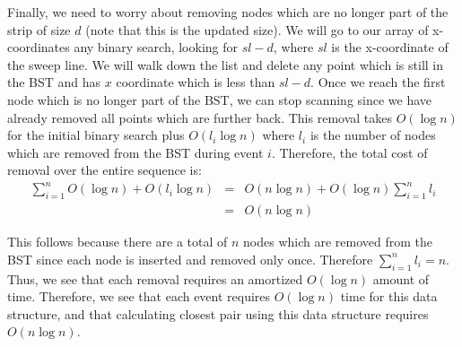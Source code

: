 \documentclass[psamsfonts]{amsart}
\newenvironment{sol}{\vspace{0.25cm}{\large \bfseries Solution:}}{\qedsymbol}
\begin{document}
\begin{sol}
Finally, we need to worry about removing nodes which are no longer part of the strip of size $d$ (note that this is the updated size). We will go to our array of x-coordinates any binary search, looking for $sl - d$, where $sl$ is the x-coordinate of the sweep line. We will walk down the list and delete any point which is still in the BST and has $x$ coordinate which is less than $sl - d$. Once we reach the first node which is no longer part of the BST, we can stop scanning since we have already removed all points which are further back. This removal takes $O(\log n)$ for the initial binary search plus $O(l_i \log n)$ where $l_i$ is the number of nodes which are removed from the BST during event $i$. Therefore, the total cost of removal over the entire sequence is:
\begin{eqnarray}
\sum_{i=1}^n O(\log n) + O(l_i \log n) &=& O(n \log n) + O(\log n) \sum_{i=1}^n l_i \\
&=& O(n \log n)
\end{eqnarray}

This follows because there are a total of $n$ nodes which are removed from the BST since each node is inserted and removed only once. Therefore $\sum_{i=1}^n l_i = n$. Thus, we see that each removal requires an amortized $O(\log n)$ amount of time. Therefore, we see that each event requires $O(\log n)$ time for this data structure, and that calculating closest pair using this data structure requires $O(n \log n)$. 
\end{sol}
\end{document}
